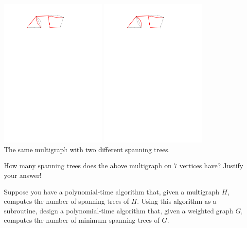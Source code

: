 \documentclass[11pt,a4paper,oneside]{article}
\begin{document}
\begin{center}
	\includegraphics[width=0.4\textwidth]{figures/multigraph-forest.pdf} \hspace{2cm}
	\includegraphics[width=0.4\textwidth]{figures/multigraph-forest-other.pdf} \\
	The same multigraph with two different spanning trees.
\end{center}

\begin{problem}{4}
\statement
How many spanning trees does the above multigraph on 7 vertices have?
Justify your answer!

\end{problem}

\begin{problem}{5}
\statement
Suppose you have a polynomial-time algorithm that, given a multigraph $H$,
computes the number of spanning trees of $H$.
Using this algorithm as a subroutine, design a polynomial-time algorithm
that, given a weighted graph $G$, computes the number of 
minimum spanning trees of $G$.

\solution

\end{problem}
\end{document}
